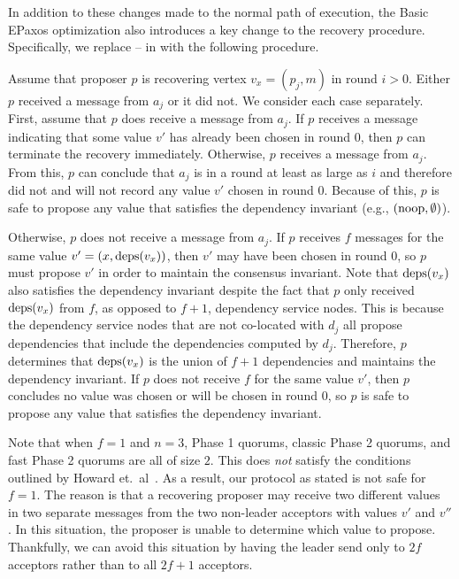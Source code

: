 In addition to these changes made to the normal path of execution, the Basic
EPaxos optimization also introduces a key change to the recovery procedure.
Specifically, we replace  -- 
in  with the following procedure.

Assume that proposer $p$ is recovering vertex $v_x = (p_j, m)$ in round $i >
0$. Either $p$ received a message from $a_j$ or it did not. We consider each
case separately.
%
First, assume that $p$ does receive a message from $a_j$. If $p$ receives a
message indicating that some value $v'$ has already been chosen in round $0$,
then $p$ can terminate the recovery immediately. Otherwise, $p$ receives a
 message from $a_j$. From this, $p$ can conclude that $a_j$ is
in a round at least as large as $i$ and therefore did not and will not record
any value $v'$ chosen in round $0$. Because of this, $p$ is safe to propose any
value that satisfies the dependency invariant (e.g., $(\text{noop}, \emptyset{})$).

Otherwise, $p$ does not receive a message from $a_j$. If $p$ receives $f$
 messages for the same value $v' = (x, \text{deps}(v_x))$,
then $v'$ may have been chosen in round $0$, so $p$ must propose $v'$ in order
to maintain the consensus invariant. Note that $\text{deps}(v_x)$ also satisfies the
dependency invariant despite the fact that $p$ only received $\text{deps}(v_x)$ from
$f$, as opposed to $f+1$, dependency service nodes. This is because the
dependency service nodes that are not co-located with $d_j$ all propose
dependencies that include the dependencies computed by $d_j$. Therefore, $p$
determines that $\text{deps}(v_x)$ is the union of $f+1$ dependencies and maintains
the dependency invariant.
%
If $p$ does not receive $f$  for the same value $v'$,
then $p$ concludes no value was chosen or will be chosen in round $0$,  so $p$
is safe to propose any value that satisfies the dependency invariant.

Note that when $f = 1$ and $n = 3$, Phase 1 quorums, classic Phase 2 quorums,
and fast Phase 2 quorums are all of size $2$. This does \emph{not} satisfy the
conditions outlined by Howard et.\ al~\cite{howard2021fast}. As a result, our
protocol as stated is not safe for $f=1$. The reason is that a recovering
proposer may receive two different values in two separate 
messages from the two non-leader acceptors with values $v'$ and $v''$. In this
situation, the proposer is unable to determine which value to propose.
Thankfully, we can avoid this situation by having the leader send only to $2f$
acceptors rather than to all $2f+1$ acceptors.

